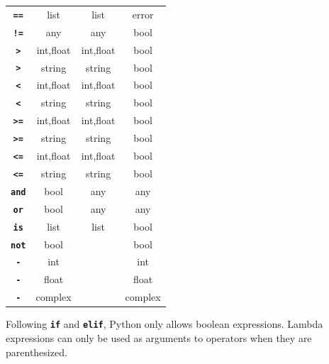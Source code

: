 \begin{center}
\begin{tabular}{c|c|c|c}
    \texttt{\textbf{==}} & list   & list     & error\\
    \texttt{\textbf{!=}} & any   & any     & bool\\
    \texttt{\textbf{>}} & int,float   & int,float     & bool\\
    \texttt{\textbf{>}} & string   & string     & bool\\
    \texttt{\textbf{<}} & int,float   & int,float     & bool\\
    \texttt{\textbf{<}} & string   & string     & bool\\
    \texttt{\textbf{>=}} & int,float   & int,float     & bool\\
    \texttt{\textbf{>=}} & string   & string     & bool\\
    \texttt{\textbf{<=}} & int,float   & int,float     & bool\\
    \texttt{\textbf{<=}} & string   & string     & bool\\
    \texttt{\textbf{and}} & bool & any & any\\
    \texttt{\textbf{or}}  & bool & any & any\\
    \texttt{\textbf{is}} & list & list & bool\\
    \texttt{\textbf{not}} & bool &     & bool\\
    \texttt{\textbf{-}}    & int &    & int\\
    \texttt{\textbf{-}}    & float &    & float\\
    \texttt{\textbf{-}}    & complex &    & complex

  \end{tabular}
\end{center}

Following \texttt{\textbf{if}} and \texttt{\textbf{elif}},
Python only allows boolean expressions. Lambda expressions can only
be used as arguments to operators when they are parenthesized.
